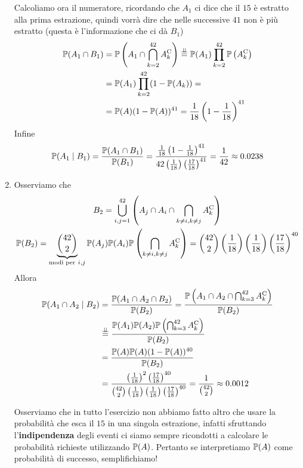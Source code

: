 \begin{enumerate}
	Calcoliamo ora il numeratore, ricordando che $A_{1}$ ci dice che il $15$ è estratto alla prima estrazione, quindi vorrà dire che nelle successive $41$ non è più estratto (questa è l'informazione che ci dà $B_{1}$)
	\begin{align*}
		\mathbb{P}( A_{1} \cap B_{1}) & =\mathbb{P}\left( A_{1} \cap \bigcap _{k=2}^{42} A_{k}^{\mathrm{C}}\right)\overset{\perp \!\!\! \perp }{=}\mathbb{P}( A_{1})\prod _{k=2}^{42}\mathbb{P}\left( A_{k}^{\mathrm{C}}\right)\\
		 & =\mathbb{P}( A_{1})\prod _{k=2}^{42}( 1-\mathbb{P}( A_{k})) =\\
		 & =\mathbb{P}( A)( 1-\mathbb{P}( A))^{41} =\frac{1}{18}\left( 1-\frac{1}{18}\right)^{41}
	\end{align*}
	Infine
	\begin{equation*}
		\mathbb{P}( A_{1} \mid B_{1}) =\frac{\mathbb{P}( A_{1} \cap B_{1})}{\mathbb{P}( B_{1})} =\frac{\frac{1}{18}\left( 1-\frac{1}{18}\right)^{41}}{42\left(\frac{1}{18}\right)\left(\frac{17}{18}\right)^{41}} =\frac{1}{42} \approx 0.0238
	\end{equation*}
	\item Osserviamo che
	\begin{gather*}
		B_{2} =\bigcup _{i,j=1}^{42}\left( A_{j} \cap A_{i} \cap \bigcap _{k\neq i,k\neq j} A_{k}\comp\right)\\
		\PP( B_{2}) =\underbrace{\binom{42}{2}}_{\text{modi per} \ i,j}\PP( A_{j})\PP( A_{i})\PP\left(\bigcap _{k\neq i,k\neq j} A_{k}\comp\right) =\binom{42}{2}\left(\frac{1}{18}\right)\left(\frac{1}{18}\right)\left(\frac{17}{18}\right)^{40}
	\end{gather*}
	Allora
	\begin{align*}
		\mathbb{P}( A_{1} \cap A_{2} \mid B_{2}) & =\frac{\mathbb{P}( A_{1} \cap A_{2} \cap B_{2})}{\mathbb{P}( B_{2})} =\frac{\mathbb{P}\left( A_{1} \cap A_{2} \cap \bigcap _{k=3}^{42} A_{k}^{\mathrm{C}}\right)}{\mathbb{P}( B_{2})}\\
		 & \overset{\perp \!\!\! \perp }{=}\frac{\mathbb{P}( A_{1})\mathbb{P}( A_{2})\mathbb{P}\left(\bigcap _{k=3}^{42} A_{k}^{\mathrm{C}}\right)}{\mathbb{P}( B_{2})}\\
		 & =\frac{\mathbb{P}( A)\mathbb{P}( A)( 1-\mathbb{P}( A))^{40}}{\mathbb{P}( B_{2})}\\
		 & =\frac{\left(\frac{1}{18}\right)^{2}\left(\frac{17}{18}\right)^{40}}{\binom{42}{2}\left(\frac{1}{18}\right)\left(\frac{1}{18}\right)\left(\frac{17}{18}\right)^{40}} =\frac{1}{\binom{42}{2}} \approx 0.0012
	\end{align*}

	\begin{oss}
		Osserviamo che in tutto l'esercizio non abbiamo fatto altro che usare la probabilità che esca il $15$ in una singola estrazione, infatti sfruttando l'\textbf{indipendenza} degli eventi ci siamo sempre ricondotti a calcolare le probabilità richieste utilizzando $\mathbb{P}( A)$. Pertanto se interpretiamo $\mathbb{P}( A)$ come probabilità di successo, semplifichiamo!
	\end{oss}
\end{enumerate}

